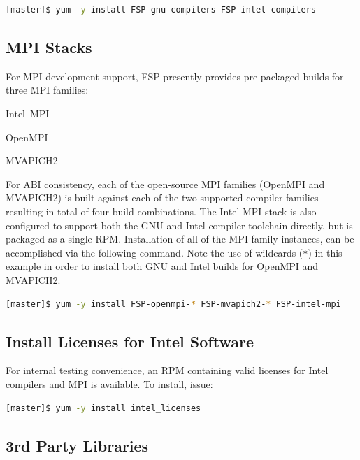 \documentclass[letterpaper]{article}
\begin{document}
\begin{lstlisting}[language=bash]
[master]$ yum -y install FSP-gnu-compilers FSP-intel-compilers
\end{lstlisting}

\subsection{MPI Stacks} \label{sec:mpi}

For MPI development support, FSP presently provides pre-packaged builds for
three MPI families: 

\begin{itemize*}
\item Intel~MPI
\item OpenMPI
\item MVAPICH2
\end{itemize*}
 For ABI consistency, each of the open-source MPI families (OpenMPI and
 MVAPICH2) is built against each of the two supported compiler families
 resulting in total of four build combinations.  The Intel MPI stack is also
 configured to support both the GNU and Intel compiler toolchain directly, but
 is packaged as a single RPM. Installation of all of the MPI family instances,
 can be accomplished via the following command. Note the use of wildcards
 (\texttt{*}) in this example in order to install both GNU and Intel builds for
 OpenMPI and MVAPICH2.

\begin{lstlisting}[language=bash]
[master]$ yum -y install FSP-openmpi-* FSP-mvapich2-* FSP-intel-mpi
\end{lstlisting}

\subsection{Install Licenses for Intel Software}

For internal testing convenience, an RPM containing valid licenses for Intel
compilers and MPI is available. To install, issue:

\begin{lstlisting}[language=bash,keywords={},upquote=true]
[master]$ yum -y install intel_licenses
\end{lstlisting}

\subsection{3rd Party Libraries}
\end{document}
